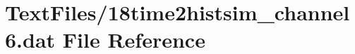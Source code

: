 \hypertarget{18time2histsim__channel6_8dat}{}\section{Text\+Files/18time2histsim\+\_\+channel6.dat File Reference}
\label{18time2histsim__channel6_8dat}

